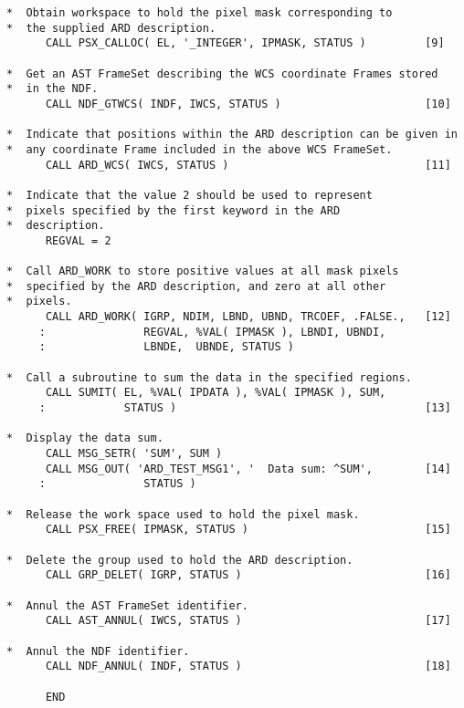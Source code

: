 \begin{verbatim}
*  Obtain workspace to hold the pixel mask corresponding to   
*  the supplied ARD description.                              
      CALL PSX_CALLOC( EL, '_INTEGER', IPMASK, STATUS )         [9]

*  Get an AST FrameSet describing the WCS coordinate Frames stored
*  in the NDF.
      CALL NDF_GTWCS( INDF, IWCS, STATUS )                      [10]

*  Indicate that positions within the ARD description can be given in
*  any coordinate Frame included in the above WCS FrameSet.
      CALL ARD_WCS( IWCS, STATUS )                              [11]

*  Indicate that the value 2 should be used to represent      
*  pixels specified by the first keyword in the ARD           
*  description.                                               
      REGVAL = 2                                              
                                                              
*  Call ARD_WORK to store positive values at all mask pixels  
*  specified by the ARD description, and zero at all other    
*  pixels.                                                    
      CALL ARD_WORK( IGRP, NDIM, LBND, UBND, TRCOEF, .FALSE.,   [12]
     :               REGVAL, %VAL( IPMASK ), LBNDI, UBNDI,    
     :               LBNDE,  UBNDE, STATUS )                  
                                                              
*  Call a subroutine to sum the data in the specified regions.
      CALL SUMIT( EL, %VAL( IPDATA ), %VAL( IPMASK ), SUM,    
     :            STATUS )                                      [13]
                                                              
*  Display the data sum.                                      
      CALL MSG_SETR( 'SUM', SUM )                             
      CALL MSG_OUT( 'ARD_TEST_MSG1', '  Data sum: ^SUM',        [14]
     :               STATUS )                                 
                                                              
*  Release the work space used to hold the pixel mask.        
      CALL PSX_FREE( IPMASK, STATUS )                           [15]
                                                              
*  Delete the group used to hold the ARD description.         
      CALL GRP_DELET( IGRP, STATUS )                            [16]
                                                              
*  Annul the AST FrameSet identifier.                                  
      CALL AST_ANNUL( IWCS, STATUS )                            [17]
                                                              
*  Annul the NDF identifier.                                  
      CALL NDF_ANNUL( INDF, STATUS )                            [18]
                                                              
      END                                                     
\end{verbatim}
\normalsize

